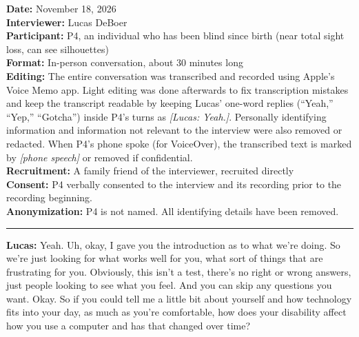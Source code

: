 \textbf{Date:} November 18, 2026
\\\textbf{Interviewer:} Lucas DeBoer
\\\textbf{Participant:} P4, an individual who has been blind since birth (near total sight loss, can see silhouettes)
\\\textbf{Format:} In-person conversation, about 30 minutes long
\\\textbf{Editing:} The entire conversation was transcribed and recorded using Apple's Voice Memo app. Light editing was done afterwards to fix transcription mistakes and keep the transcript readable by keeping Lucas' one-word replies (``Yeah,'' ``Yep,'' ``Gotcha'') inside P4's turns as \textit{[Lucas: Yeah.]}. Personally identifying information and information not relevant to the interview were also removed or redacted. When P4's phone spoke (for VoiceOver), the transcribed text is marked by \textit{[phone speech]} or removed if confidential.
\\\textbf{Recruitment:} A family friend of the interviewer, recruited directly
\\\textbf{Consent:} P4 verbally consented to the interview and its recording prior to the recording beginning.
\\\textbf{Anonymization:} P4 is not named. All identifying details have been removed.


\bigskip
\hrule
\bigskip

\textbf{Lucas:} Yeah. Uh, okay, I gave you the introduction as to what we're doing. So we're just looking for what works well for you, what sort of things that are frustrating for you. Obviously, this isn't a test, there's no right or wrong answers, just people looking to see what you feel. And you can skip any questions you want. Okay. So if you could tell me a little bit about yourself and how technology fits into your day, as much as you're comfortable, how does your disability affect how you use a computer and has that changed over time?

